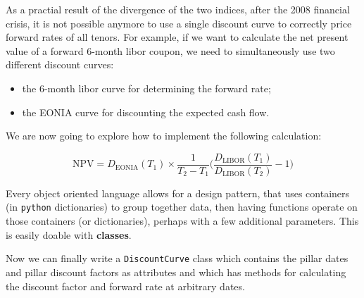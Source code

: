 As a practial result of the divergence of the two indices, after the 2008 financial crisis, it is not possible anymore to use a single discount curve to correctly price forward rates of all tenors. For example, if we want to calculate the net present value of a forward 6-month libor coupon, we need to simultaneously use two different discount curves:

\begin{itemize}
\tightlist
\item the 6-month libor curve for determining the forward rate;
\item the EONIA curve for discounting the expected cash flow.
\end{itemize}

We are now going to explore how to implement the following calculation:

\[\mathrm{NPV} = D_{\mathrm{EONIA}}(T_1) \times \frac{1}{T_2-T_1}\Big(\frac{D_{\mathrm{LIBOR}}(T_1)}{D_{\mathrm{LIBOR}}(T_2)} - 1 \Big)\]

Every object oriented language allows for a design pattern, that uses containers (in \texttt{python} dictionaries) to group together data, then having functions operate on those containers (or dictionaries), perhaps with a few additional parameters. This is easily doable with \textbf{classes}.

Now we can finally write a \texttt{DiscountCurve} class which contains the pillar dates and pillar discount factors as attributes and which has methods for calculating the discount factor and forward rate at arbitrary dates.

